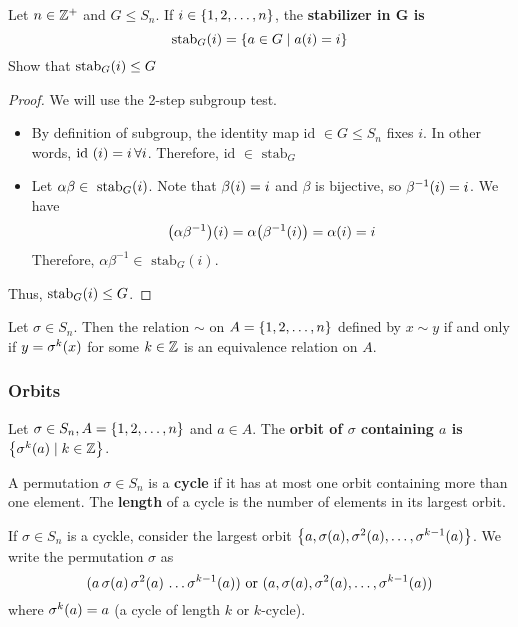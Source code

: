 \begin{exercise}
    Let $n \in \mathbb{Z}^+$ and $G \leq S_n$. If $i \in \qty{1, 2, \ldots, n}$, the \textbf{stabilizer in G is}
    \[ \text{stab}_G\qty(i) = \qty{a \in G \mid a \qty(i) = i} \]
    Show that $\text{stab}_G \qty(i) \leq G$
\end{exercise}

\begin{proof} We will use the 2-step subgroup test.
    \begin{itemize}
        \item     By definition of subgroup, the identity map $\text{id } \in G \leq S_n$ fixes $i$. In other words, $\text{id } \qty(i) = i \, \forall i$. Therefore, $\text{id } \in \text{ stab}_G$ 
        \item Let $\alpha \beta \in \text{ stab}_G \qty(i)$. Note that $\beta \qty(i) = i$ and $\beta$ is bijective, so $\beta^{-1} \qty(i) = i$. We have
        \[
            \qty(\alpha \beta^{-1}) \qty(i) = \alpha \qty(\beta^{-1} \qty(i)) = \alpha \qty(i) = i
        \]
        Therefore, $\alpha \beta^{-1} \in \text{ stab}_G (i)$.
    \end{itemize}
    Thus, $\text{stab}_G \qty(i) \leq G$. \qedsymbol
\end{proof}

\begin{theorem}
    Let $\sigma \in S_n$. Then the relation $\sim$ on $A = \qty{1, 2, \ldots, n}$ defined by $x \sim y$ if and only if $y = \sigma^k \qty(x)$ for some $k \in \mathbb{Z}$ is an equivalence relation on $A$.
\end{theorem}

\subsubsection{Orbits}

\begin{definition}
    Let $\sigma \in S_n, A = \qty{1, 2, \ldots, n}$ and $a \in A$. The \textbf{orbit of $\sigma$ containing $a$ is} $\qty{\sigma^k \qty(a) \mid k \in \mathbb{Z}}$.
\end{definition}

\begin{definition}
    A permutation $\sigma \in S_n$ is a \textbf{cycle} if it has at most one orbit containing more than one element. The \textbf{length} of a cycle is the number of elements in its largest orbit. 
\end{definition}

\begin{remark}
    If $\sigma \in S_n$ is a cyckle, consider the largest orbit $\qty{a, \sigma (a), \sigma^2 (a), \ldots, \sigma^{k  - 1} (a)}$. We write the permutation $\sigma$ as
    \[ (a \, \sigma \qty(a) \, \sigma^2 \qty(a) \, \ldots \sigma^{k - 1} \qty(a)) \text{ or }  (a, \sigma \qty(a), \sigma^2 \qty(a), \ldots, \sigma^{k - 1} \qty(a))\]
    where $\sigma^k \qty(a) = a$ (a cycle of length $k$ or $k$-cycle).
\end{remark}

